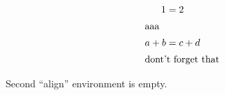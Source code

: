 \documentclass{article}
\begin{document}
\begin{align}
1 &=2\\
\intertext{aaa}
a+b&=c+d\\
\intertext{dont't forget that}
\end{align}

Second ``align'' environment is empty.
\end{document}

